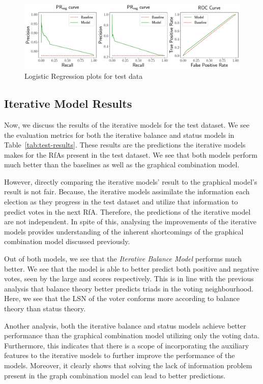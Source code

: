 \begin{figure}[htp]
    \centering
    \includegraphics[width=\textwidth]{images/Logisitc Regression_test.pdf}
    \caption{Logistic Regression plots for test data}
    \label{fig:lr-test-plots}
\end{figure}

\subsection{Iterative Model Results}
Now, we discuss the results of the iterative models for the test dataset.
We see the evaluation metrics for both the iterative balance and status models in Table~\ref{tab:test-results}.
These results are the predictions the iterative models makes for the RfAs present in the test dataset. 
We see that both models perform much better than the baselines as well as the graphical combination model.

However, directly comparing the iterative models' result to the graphical model's result is not fair.
Because, the iterative models assimilate the information each election as they progress in the test dataset and utilize that information to predict votes in the next RfA.
Therefore, the predictions of the iterative model are not independent.
In spite of this, analysing the improvements of the iterative models provides understanding of the inherent shortcomings of the graphical combination model discussed previously.

Out of both models, we see that the \textit{Iterative Balance Model} performs much better.
We see that the model is able to better predict both positive and negative votes, seen by the large \aucposPR and \aucnegPR scores respectively.
This is in line with the previous analysis that balance theory better predicts triads in the voting neighbourhood.
Here, we see that the LSN of the voter conforms more according to balance theory than status theory. 

Another analysis, both the iterative balance and status models achieve better performance than the graphical combination model utilizing only the voting data.
Furthermore, this indicates that there is a scope of incorporating the auxiliary features to the iterative models to further improve the performance of the models.
Moreover, it clearly shows that solving the lack of information problem present in the graph combination model can lead to better predictions.

